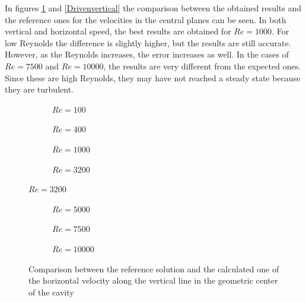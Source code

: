 In figures \ref{Drivenhorizontal} and \ref{Drivenvertical} the comparison between the obtained results and the reference ones for the velocities in the central planes can be seen. In both vertical and horizontal speed, the best results are obtained for $Re=1000$. For low Reynolds the difference is slightly higher, but the results are still accurate. However, as the Reynolds increases, the error increases as well. In the cases of $Re=7500$ and $Re=10000$, the results are very different from the expected ones. Since these are high Reynolds, they may have not reached a steady state because they are turbulent.
\begin{figure}[h]
	\centering
	\begin{subfigure}{0.5\textwidth}
		\resizebox{1.4\textwidth}{!}{}
		\caption{$Re=100$}
	\end{subfigure}%
	\begin{subfigure}{0.5\textwidth}
		\resizebox{1.4\textwidth}{!}{}
		\caption{$Re=400$}
	\end{subfigure}
	\begin{subfigure}{0.5\textwidth}
		\resizebox{1.4\textwidth}{!}{}
		\caption{$Re=1000$}
	\end{subfigure}%
	\begin{subfigure}{0.5\textwidth}
		\resizebox{1.4\textwidth}{!}{}
		\caption{$Re=3200$}
	\end{subfigure}
\end{figure}
\begin{figure}\ContinuedFloat
	\begin{subfigure}{0.5\textwidth}
		\resizebox{1.4\textwidth}{!}{}
		\caption{$Re=5000$}
	\end{subfigure}%
	\begin{subfigure}{0.5\textwidth}
		\resizebox{1.4\textwidth}{!}{}
		\caption{$Re=7500$}
	\end{subfigure}
	\begin{subfigure}{0.5\textwidth}
		\center
		\resizebox{1.4\textwidth}{!}{}
		\caption{$Re=10000$}
	\end{subfigure}
	\caption[Comparison between the reference solution and the calculated one of the horizontal velocity along the vertical line in the geometric center of the cavity]{Comparison between the reference solution and the calculated one of the horizontal velocity along the vertical line in the geometric center of the cavity \cite{Ghia1982}}
	\label{Drivenhorizontal}
\end{figure}

